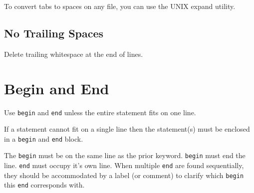       To convert tabs to spaces on any file, you can use the UNIX expand utility.

    \subsection{No Trailing Spaces}
    \label{systemverilog_conventions:general_file_rules:no_trailing_spaces}

      \begin{keybox}
        Delete trailing whitespace at the end of lines.
      \end{keybox}

  \section{Begin and End}
  \label{systemverilog_conventions:begin_and_end}

    \begin{keybox}
      Use \lstinline{begin} and \lstinline{end} unless the entire statement fits on one line.
    \end{keybox}

    If a statement cannot fit on a single line then the statement(s) must be enclosed in a \lstinline{begin} and \lstinline{end} block.

    \begin{goodbox}
      
    \end{goodbox}

    \begin{goodbox}
      
    \end{goodbox}

    \begin{badbox}
      
    \end{badbox}

    The \lstinline{begin} must be on the same line as the prior keyword.
    \lstinline{begin} must end the line.
    \lstinline{end} must occupy it's own line.
    When multiple \lstinline{end} are found sequentially, they should be accommodated by a label (or comment) to clarify which \lstinline{begin} this \lstinline{end} corresponds with.

    \begin{goodbox}
      
    \end{goodbox}

